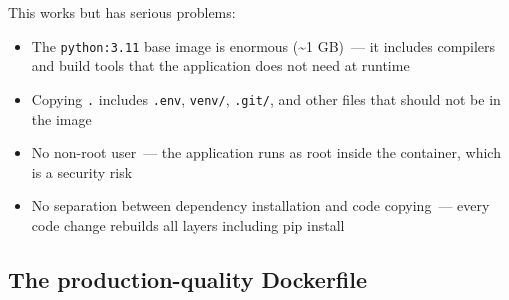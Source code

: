 \noindent{}This works but has serious problems:

\begin{itemize}
\tightlist
\item
  The \texttt{python:3.11} base image is enormous (\textasciitilde1 GB)~--- it includes compilers and build tools that the application does not need at runtime
\item
  Copying \texttt{.} includes \texttt{.env}, \texttt{venv/}, \texttt{.git/}, and other files that should not be in the image
\item
  No non-root user~--- the application runs as root inside the container, which is a security risk
\item
  No separation between dependency installation and code copying~--- every code change rebuilds all layers including pip install
\end{itemize}

\subsection*{The production-quality Dockerfile}\label{18-containerization:the-production-quality-dockerfile}

